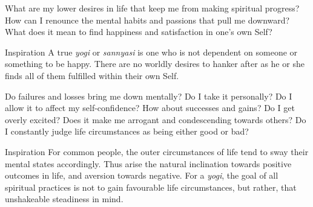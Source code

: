 \newpage
\begin{mananam}{}
\mananamtext What are my lower desires in life that keep me from making spiritual progress? How can I renounce the mental habits and passions that pull me downward? What does it mean to find happiness and satisfaction in one’s own Self?
\end{mananam}
\WritingHand{}
\begin{inspiration}{\mananamfont Inspiration}
\mananamtext A true \emph{yogi} or \emph{sannyasi} is one who is not dependent on someone or something to be happy. There are no worldly desires to hanker after as he or she finds all of them fulfilled within their own Self.
\end{inspiration}
\newpage


\newpage
\begin{mananam}{}
\mananamtext Do failures and losses bring me down mentally? Do I take it personally? Do I allow it to affect my self-confidence? How about successes and gains? Do I get overly excited? Does it make me arrogant and condescending towards others? Do I constantly judge life circumstances as being either good or bad?
\end{mananam}
\WritingHand{}
\begin{inspiration}{\mananamfont Inspiration}
\mananamtext For common people, the outer circumstances of life tend to sway their mental states accordingly. Thus arise the natural inclination towards positive outcomes in life, and aversion towards negative. For a \emph{yogi}, the goal of all spiritual practices is not to gain favourable life circumstances, but rather, that unshakeable steadiness in mind.
\end{inspiration}
\newpage

